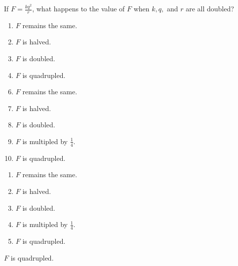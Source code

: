 



 If $F= \frac{kq^{2}}{r}$, what happens to the value of $F$ when $k,q,$ and $r$ are all doubled?


\ifsat
	\begin{enumerate}[label=\Alph*)]
		\item   $F$ remains the same.
		\item   $F$ is halved.
		\item   $F$ is doubled.
		\item   $F$ is quadrupled.%
	\end{enumerate}
\else
\fi

\ifacteven
	\begin{enumerate}[label=\textbf{\Alph*.},itemsep=\fill,align=left]
		\setcounter{enumii}{5}
		\item   $F$ remains the same.
		\item   $F$ is halved.
		\item   $F$ is doubled.
		\addtocounter{enumii}{1}
		\item  $F$ is multipled by $\frac{1}{4}$.
		\item   $F$ is quadrupled.%
	\end{enumerate}
\else
\fi

\ifactodd
	\begin{enumerate}[label=\textbf{\Alph*.},itemsep=\fill,align=left]
		\item   $F$ remains the same.
		\item   $F$ is halved.
		\item   $F$ is doubled.
		\item  $F$ is multipled by $\frac{1}{4}$.
		\item   $F$ is quadrupled.%
	\end{enumerate}
\else
\fi

\ifgridin
   $F$ is quadrupled.%

\else
\fi

